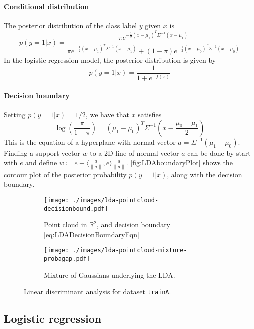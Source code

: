 \documentclass[11pt]{article}
\newcommand\RR{\mathbb{R}}
\begin{document}
\paragraph{Conditional distribution} The posterior distribution of the class label $y$ given $x$ is
\[
p(y=1|x) =
\frac{
	\pi e^{-\frac{1}{2}(x-\mu_1)^T\Sigma^{-1}(x-\mu_1)}
}{
	\pi e^{-\frac{1}{2}(x-\mu_1)^T\Sigma^{-1}(x-\mu_1)} +
	(1-\pi) e^{-\frac{1}{2}(x-\mu_0)^T\Sigma^{-1}(x-\mu_0)}
}
\]
In the logistic regression model, the posterior distribution is given by
\[
	p(y=1|x) =
	\frac{1}{1 + e^{-f(x)}}
\]


\paragraph{Decision boundary} Setting $p(y=1|x) = 1/2$, we have that $x$ satisfies
\begin{equation}\label{eq:LDADecisionBoundaryEqn}
	\log\left(\frac{\pi}{1-\pi}\right) =
	(\mu_1 - \mu_0)^T\Sigma^{-1}\left(x - \frac{\mu_0+\mu_1}{2}\right)
\end{equation}
This is the equation of a hyperplane with normal vector $a = \Sigma^{-1}(\mu_1 - \mu_0)$. Finding a support vector $w$ to a 2D line of normal vector $a$ can be done by start with $e$ and define $w\coloneqq e - \langle \frac{a}{\|a\|}, e\rangle \frac{a}{\|a\|}$. \autoref{fig:LDAboundaryPlot} shows the contour plot of the posterior probability $p(y=1|x)$, along with the decision boundary.

\begin{figure}
	\centering
	\begin{subfigure}[t]{.49\linewidth}
	\texttt{[image: ./images/lda-pointcloud-decisionbound.pdf]}
	\caption{Point cloud in $\RR^2$, and decision boundary \eqref{eq:LDADecisionBoundaryEqn}}
	\label{fig:LDAboundaryPlot}
	\end{subfigure}
	\begin{subfigure}[t]{.49\linewidth}
	\texttt{[image: ./images/lda-pointcloud-mixture-probagap.pdf]}
	\caption{Mixture of Gaussians underlying the LDA.}
	\end{subfigure}
	\caption{Linear discriminant analysis for dataset \texttt{trainA}.}\label{fig:LDAplot}
\end{figure}



\subsection{Logistic regression}
\end{document}
